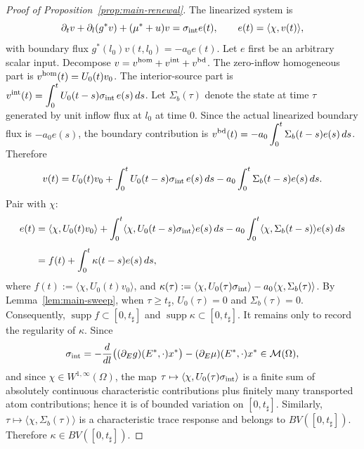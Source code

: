 \documentclass[pdflatex,sn-mathphys-num]{sn-jnl}
\theoremstyle{thmstyleone}
\theoremstyle{definition}
\theoremstyle{remark}
\newcommand{\Om}{\Omega}
\newcommand{\Mm}{\mathcal{M}}
\numberwithin{equation}{section}
\begin{document}
\begin{proof}[Proof of Proposition~\ref{prop:main-renewal}]
The linearized system is
\[
\partial_t v+\partial_l(g^*v)+(\mu^*+u)v
=
\sigma_{\rm int}e(t),
\qquad
e(t)=\langle\chi,v(t)\rangle,
\]
with boundary flux
$\displaystyle 
g^*(l_0)v(t,l_0)=-a_0e(t)$.
Let \(e\) first be an arbitrary scalar input. Decompose
$\displaystyle 
v=v^{\rm hom}+v^{\rm int}+v^{\rm bd}$.
The zero-inflow homogeneous part is
$\displaystyle 
v^{\rm hom}(t)=U_0(t)v_0$.
The interior-source part is
$\displaystyle 
v^{\rm int}(t)
=
\int_0^t U_0(t-s)\sigma_{\rm int}\,e(s)\,ds$.
Let \(\Sigma_b(\tau)\) denote the state at time \(\tau\) generated by unit inflow
flux at \(l_0\) at time \(0\). Since the actual linearized boundary flux is
$\displaystyle 
-a_0e(s)$,
the boundary contribution is
$\displaystyle 
v^{\rm bd}(t)
=
-a_0\int_0^t\Sigma_b(t-s)e(s)\,ds$.
Therefore
\[
v(t)
=
U_0(t)v_0
+
\int_0^t U_0(t-s)\sigma_{\rm int}\,e(s)\,ds
-
a_0\int_0^t \Sigma_b(t-s)e(s)\,ds .
\]
Pair with \(\chi\):
\[
\begin{aligned}
e(t)
&=
\langle\chi,U_0(t)v_0\rangle
+
\int_0^t
\langle\chi,U_0(t-s)\sigma_{\rm int}\rangle e(s)\,ds
-
a_0\int_0^t
\langle\chi,\Sigma_b(t-s)\rangle e(s)\,ds\\[4pt]
&=f(t)+\int_0^t\kappa(t-s)e(s)\,ds,
\end{aligned}
\]
where
$\displaystyle 
f(t):=\langle\chi,U_0(t)v_0\rangle$,
and
$\kappa(\tau)
:=
\langle\chi,U_0(\tau)\sigma_{\rm int}\rangle
-
a_0\langle\chi,\Sigma_b(\tau)\rangle$.
By Lemma~\ref{lem:main-sweep}, when $\tau\ge t_\sharp$, $U_0(\tau)=0$ and $\Sigma_b(\tau)=0$.
Consequently,
$\operatorname{supp}f\subset[0,t_\sharp]$ and
$\operatorname{supp}\kappa\subset[0,t_\sharp]$.
It remains only to record the regularity of \(\kappa\). Since
\[
\sigma_{\rm int}
=
-\frac{d}{dl}\big((\partial_E g)(E^*,\cdot)x^*\big)
-(\partial_E\mu)(E^*,\cdot)x^*
\in\Mm(\Om),
\]
and since \(\chi\in W^{1,\infty}(\Om)\), the map
$\tau\mapsto \langle\chi,U_0(\tau)\sigma_{\rm int}\rangle$
is a finite sum of absolutely continuous characteristic contributions plus
finitely many transported atom contributions; hence it is of bounded variation
on \([0,t_\sharp]\). Similarly,
$\tau\mapsto \langle\chi,\Sigma_b(\tau)\rangle$
is a characteristic trace response and belongs to \(BV([0,t_\sharp])\). Therefore
$\kappa\in BV([0,t_\sharp])$.
\end{proof}
\end{document}

